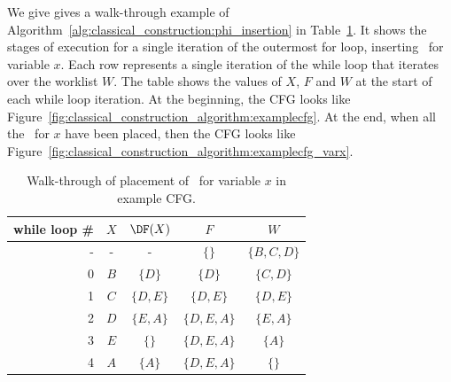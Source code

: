 {We give gives a walk-through example of 
Algorithm~\ref{alg:classical_construction:phi_insertion} in
Table~\ref{table:classical_construction:walkthru}. 
It shows the stages of execution for a single iteration of
the outermost for loop, inserting \phifuns\
for variable $x$.
Each row represents a single iteration of the while loop
that iterates over the worklist $W$. The table shows the values
of $X$, $F$ and $W$ at the start of each while loop iteration.
At the beginning, the CFG looks like Figure~\ref{fig:classical_construction_algorithm:examplecfg}.
At the end, when all the \phifuns\ for $x$ have
been placed, then the CFG looks like Figure~\ref{fig:classical_construction_algorithm:examplecfg_varx}.



\begin{table}
\begin{center}
\begin{tabular}{|r|c|c|c|c|}
\hline
\textbf{while loop \#} & $X$ & $\DF(X)$ & $F$         & $W$\\ \hline\hline
-                      & -   & -                & $\{\}$      & $\{B,C,D\}$ \\
0                      & $B$ & $\{D\}$          & $\{D\}$     & $\{C,D\}$ \\
1                      & $C$ & $\{D,E\}$        & $\{D,E\}$   & $\{D,E\}$ \\
2                      & $D$ & $\{E,A\}$        & $\{D,E,A\}$ & $\{E,A\}$\\
3                      & $E$ & $\{\}$           & $\{D,E,A\}$ & $\{A\}$\\
4                      & $A$ & $\{A\}$          & $\{D,E,A\}$ & $\{\}$\\ \hline
\end{tabular}
\end{center}
\caption{\label{table:classical_construction:walkthru}Walk-through of
  placement of \phifuns\ for variable $x$ in example CFG.}
\end{table}


}
